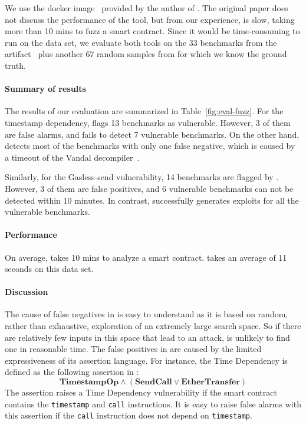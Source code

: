 We use the docker image~\cite{fuzz-docker} provided by the author of \contractfuzz.
The original paper does not discuss the performance of the tool, 
but from our experience, \contractfuzz is slow, taking more than 
10 mins to fuzz a smart contract. Since it would be time-consuming to 
run \contractfuzz on the \etherscan data set, we evaluate both tools 
on the 33 benchmarks from the \contractfuzz artifact~\cite{fuzz-data} plus another
67 random samples from \etherscan for which we know the ground truth.

\paragraph{Summary of results}
The results of our evaluation are summarized in Table~\ref{fig:eval-fuzz}.
For the timestamp dependency, \contractfuzz flags 13 benchmarks 
as vulnerable. However, 3 of them are false alarms, and \contractfuzz fails to detect 7 
vulnerable benchmarks. On the other hand, \toolname detects most of 
the benchmarks with only one false negative, which is caused by a timeout of the Vandal
decompiler~\cite{madmax}.

Similarly, for the Gasless-send vulnerability, 14 benchmarks are flagged by \contractfuzz.
However, 3 of them are false positives, and 6 vulnerable benchmarks can not be detected 
within 10 minutes. In contrast, \toolname successfully generates exploits for 
all the vulnerable benchmarks.

\paragraph{Performance}
On average, \contractfuzz takes 10 mins to analyze a smart contract. 
\toolname takes an average of 11 seconds on this data set.

\paragraph{Discussion}
The cause of false negatives in \contractfuzz is easy to understand as it is
based on random, rather than exhaustive, exploration of an extremely large
search space. So if there are relatively few inputs in this space that lead to
an attack, \contractfuzz is unlikely to find one in reasonable time. The false
positives in \contractfuzz are caused by the limited expressiveness of its
assertion language. For instance, the Time Dependency is defined as the
following assertion in \contractfuzz: 
\[
\textbf{TimestampOp} \wedge (\textbf{SendCall} \vee \textbf{EtherTransfer})
\]
The assertion raises a Time Dependency vulnerability if the smart contract
contains the \texttt{timestamp} and \texttt{call} instructions. It is
easy to raise false alarms with this assertion if the \texttt{call} instruction 
does not depend on \texttt{timestamp}. 

 \\